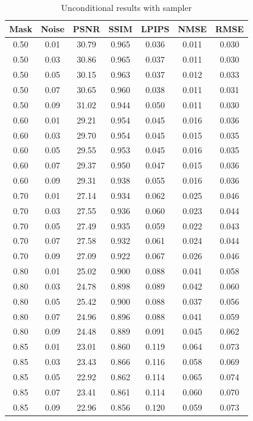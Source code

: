 \begin{table}[htbp]
\centering
\caption{Unconditional results with sampler}
\label{tab:uncond_sampler}
\begin{tabular}{ccccccc}
\toprule
Mask & Noise & PSNR & SSIM & LPIPS & NMSE & RMSE \\\midrule
0.50 & 0.01 & 30.79 & 0.965 & 0.036 & 0.011 & 0.030 \\
0.50 & 0.03 & 30.86 & 0.965 & 0.037 & 0.011 & 0.030 \\
0.50 & 0.05 & 30.15 & 0.963 & 0.037 & 0.012 & 0.033 \\
0.50 & 0.07 & 30.65 & 0.960 & 0.038 & 0.011 & 0.031 \\
0.50 & 0.09 & 31.02 & 0.944 & 0.050 & 0.011 & 0.030 \\
0.60 & 0.01 & 29.21 & 0.954 & 0.045 & 0.016 & 0.036 \\
0.60 & 0.03 & 29.70 & 0.954 & 0.045 & 0.015 & 0.035 \\
0.60 & 0.05 & 29.55 & 0.953 & 0.045 & 0.016 & 0.035 \\
0.60 & 0.07 & 29.37 & 0.950 & 0.047 & 0.015 & 0.036 \\
0.60 & 0.09 & 29.31 & 0.938 & 0.055 & 0.016 & 0.036 \\
0.70 & 0.01 & 27.14 & 0.934 & 0.062 & 0.025 & 0.046 \\
0.70 & 0.03 & 27.55 & 0.936 & 0.060 & 0.023 & 0.044 \\
0.70 & 0.05 & 27.49 & 0.935 & 0.059 & 0.022 & 0.043 \\
0.70 & 0.07 & 27.58 & 0.932 & 0.061 & 0.024 & 0.044 \\
0.70 & 0.09 & 27.09 & 0.922 & 0.067 & 0.026 & 0.046 \\
0.80 & 0.01 & 25.02 & 0.900 & 0.088 & 0.041 & 0.058 \\
0.80 & 0.03 & 24.78 & 0.898 & 0.089 & 0.042 & 0.060 \\
0.80 & 0.05 & 25.42 & 0.900 & 0.088 & 0.037 & 0.056 \\
0.80 & 0.07 & 24.96 & 0.896 & 0.088 & 0.041 & 0.059 \\
0.80 & 0.09 & 24.48 & 0.889 & 0.091 & 0.045 & 0.062 \\
0.85 & 0.01 & 23.01 & 0.860 & 0.119 & 0.064 & 0.073 \\
0.85 & 0.03 & 23.43 & 0.866 & 0.116 & 0.058 & 0.069 \\
0.85 & 0.05 & 22.92 & 0.862 & 0.114 & 0.065 & 0.074 \\
0.85 & 0.07 & 23.41 & 0.861 & 0.114 & 0.060 & 0.070 \\
0.85 & 0.09 & 22.96 & 0.856 & 0.120 & 0.059 & 0.073 \\

\end{tabular}
\end{table}
